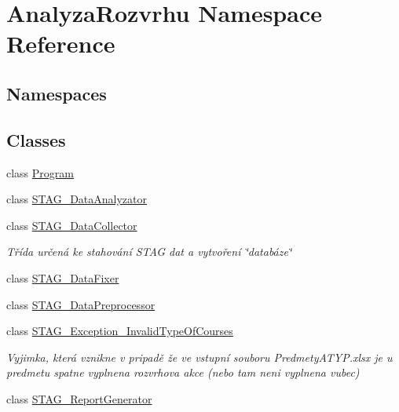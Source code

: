 \hypertarget{namespace_analyza_rozvrhu}{}\section{Analyza\+Rozvrhu Namespace Reference}
\label{namespace_analyza_rozvrhu}
\subsection*{Namespaces}
\begin{DoxyCompactItemize}
\end{DoxyCompactItemize}
\subsection*{Classes}
\begin{DoxyCompactItemize}
\item 
class \hyperlink{class_analyza_rozvrhu_1_1_program}{Program}
\item 
class \hyperlink{class_analyza_rozvrhu_1_1_s_t_a_g___data_analyzator}{S\+T\+A\+G\+\_\+\+Data\+Analyzator}
\item 
class \hyperlink{class_analyza_rozvrhu_1_1_s_t_a_g___data_collector}{S\+T\+A\+G\+\_\+\+Data\+Collector}
\begin{DoxyCompactList}\small\item\em Třída určená ke stahování S\+T\+AG dat a vytvoření \char`\"{}databáze\char`\"{} \end{DoxyCompactList}\item 
class \hyperlink{class_analyza_rozvrhu_1_1_s_t_a_g___data_fixer}{S\+T\+A\+G\+\_\+\+Data\+Fixer}
\item 
class \hyperlink{class_analyza_rozvrhu_1_1_s_t_a_g___data_preprocessor}{S\+T\+A\+G\+\_\+\+Data\+Preprocessor}
\item 
class \hyperlink{class_analyza_rozvrhu_1_1_s_t_a_g___exception___invalid_type_of_courses}{S\+T\+A\+G\+\_\+\+Exception\+\_\+\+Invalid\+Type\+Of\+Courses}
\begin{DoxyCompactList}\small\item\em Vyjimka, která vznikne v pripadě že ve vstupní souboru Predmety\+A\+T\+Y\+P.\+xlsx je u predmetu spatne vyplnena rozvrhova akce (nebo tam neni vyplnena vubec) \end{DoxyCompactList}\item 
class \hyperlink{class_analyza_rozvrhu_1_1_s_t_a_g___report_generator}{S\+T\+A\+G\+\_\+\+Report\+Generator}
\end{DoxyCompactItemize}
